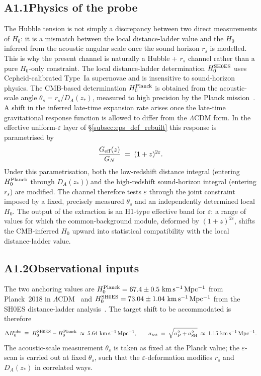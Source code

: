 \subsection*{A1.1\quad Physics of the probe}

The Hubble tension is not simply a discrepancy between two direct
measurements of $H_0$: it is a mismatch between the local
distance-ladder value and the $H_0$ inferred from the acoustic
angular scale once the sound horizon $r_s$ is modelled. This is why
the present channel is naturally a Hubble + $r_s$ channel rather
than a pure $H_0$-only constraint. The local distance-ladder
determination $H_0^{\rm SH0ES}$ uses Cepheid-calibrated Type~Ia
supernovae and is insensitive to sound-horizon physics. The
CMB-based determination $H_0^{\rm Planck}$ is obtained from the
acoustic-scale angle $\theta_s = r_s / D_A(z_*)$, measured to high
precision by the Planck mission~\cite{Planck2018}. A shift in the
inferred late-time expansion rate arises once the late-time
gravitational response function is allowed to differ from the
$\Lambda$CDM form. In the effective uniform-$\varepsilon$ layer of
\S\ref{subsec:eps_def_rebuilt} this response is parametrised by
\begin{equation}
\frac{G_{\rm eff}(z)}{G_N} \;=\; (1+z)^{2\varepsilon}.
\label{eq:Geff_uniform_eps_A1}
\end{equation}
Under this parametrisation, both the low-redshift distance integral
(entering $H_0^{\rm Planck}$ through $D_A(z_*)$) and the high-redshift
sound-horizon integral (entering $r_s$) are modified. The channel
therefore tests $\varepsilon$ through the joint constraint imposed
by a fixed, precisely measured $\theta_s$ and an independently
determined local $H_0$. The output of the extraction is an H1-type
effective band for $\varepsilon$: a range of values for which the
common-background module, deformed by $(1+z)^{2\varepsilon}$,
shifts the CMB-inferred $H_0$ upward into statistical compatibility
with the local distance-ladder value.

\subsection*{A1.2\quad Observational inputs}

The two anchoring values are
$H_0^{\rm Planck} = 67.4 \pm 0.5~\mathrm{km\,s^{-1}\,Mpc^{-1}}$
from Planck~2018 in $\Lambda$CDM~\cite{Planck2018} and
$H_0^{\rm SH0ES} = 73.04 \pm 1.04~\mathrm{km\,s^{-1}\,Mpc^{-1}}$
from the SH0ES distance-ladder analysis~\cite{Riess2022}. The target
shift to be accommodated is therefore
\begin{equation}
\Delta H_0^{\rm obs}
\;\equiv\; H_0^{\rm SH0ES} - H_0^{\rm Planck}
\;\approx\; 5.64~\mathrm{km\,s^{-1}\,Mpc^{-1}},
\qquad
\sigma_{\rm tot} \;=\; \sqrt{\sigma_P^2 + \sigma_{\rm SH}^2}
\;\approx\; 1.15~\mathrm{km\,s^{-1}\,Mpc^{-1}}.
\end{equation}
The acoustic-scale measurement $\theta_s$ is taken as fixed at the
Planck value; the $\varepsilon$-scan is carried out at fixed
$\theta_s$, such that the $\varepsilon$-deformation modifies $r_s$
and $D_A(z_*)$ in correlated ways.

